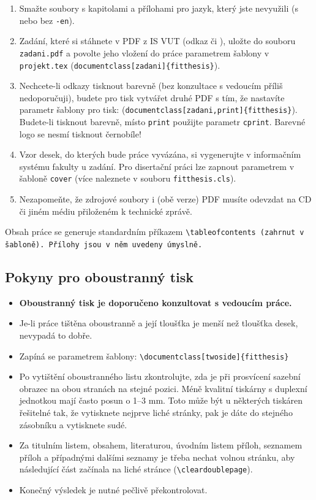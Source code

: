 \begin{enumerate}
  \item Smažte soubory s kapitolami a přílohami pro jazyk, který jste nevyužili (s nebo bez \texttt{-en}).
  \item Zadání, které si stáhnete v PDF z IS VUT (odkaz  či ), uložte do souboru \texttt{zadani.pdf} a povolte jeho vložení do práce parametrem šablony v \texttt{projekt.tex} (\verb|document|\verb|class[zadani]{fitthesis}|).
  \item Nechcete-li odkazy tisknout barevně (bez konzultace s vedoucím příliš nedoporučuji), budete pro tisk vytvářet druhé PDF s tím, že nastavíte parametr šablony pro tisk: (\verb|document|\verb|class[zadani,print]{fitthesis}|). Budete-li tisknout barevně, místo \texttt{print} použijte parametr \texttt{cprint}. Barevné logo se nesmí tisknout černobíle!
  \item Vzor desek, do kterých bude práce vyvázána, si vygenerujte v informačním systému fakulty u zadání. Pro disertační práci lze zapnout parametrem v šabloně \texttt{cover} (více naleznete v souboru \texttt{fitthesis.cls}).
  \item Nezapomeňte, že zdrojové soubory i (obě verze) PDF musíte odevzdat na CD či jiném médiu přiloženém k technické zprávě.
\end{enumerate}

Obsah práce se generuje standardním příkazem \tt \textbackslash tableofcontents \rm (zahrnut v šabloně). Přílohy jsou v něm uvedeny úmyslně.

\subsection{Pokyny pro oboustranný tisk}
\begin{itemize}
\item \textbf{Oboustranný tisk je doporučeno konzultovat s vedoucím práce.}
\item Je-li práce tištěna oboustranně a její tloušťka je menší než tloušťka desek, nevypadá to dobře.
\item Zapíná se parametrem šablony: \verb|\document|\verb|class[twoside]{fitthesis}|
\item Po vytištění oboustranného listu zkontrolujte, zda je při prosvícení sazební obrazec na obou stranách na stejné pozici. Méně kvalitní tiskárny s duplexní jednotkou mají často posun o 1--3 mm. Toto může být u některých tiskáren řešitelné tak, že vytisknete nejprve liché stránky, pak je dáte do stejného zásobníku a vytisknete sudé.
\item Za titulním listem, obsahem, literaturou, úvodním listem příloh, seznamem příloh a případnými dalšími seznamy je třeba nechat volnou stránku, aby následující část začínala na liché stránce (\texttt{\textbackslash cleardoublepage}).
\item  Konečný výsledek je nutné pečlivě překontrolovat.
\end{itemize}

